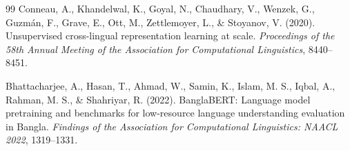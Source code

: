 \documentclass[11pt,twocolumn]{article}
\begin{document}
\begin{thebibliography}{99}
 Conneau, A., Khandelwal, K., Goyal, N., Chaudhary, V., Wenzek, G., Guzmán, F., Grave, E., Ott, M., Zettlemoyer, L., \& Stoyanov, V. (2020). Unsupervised cross-lingual representation learning at scale. \textit{Proceedings of the 58th Annual Meeting of the Association for Computational Linguistics}, 8440--8451.

 Bhattacharjee, A., Hasan, T., Ahmad, W., Samin, K., Islam, M. S., Iqbal, A., Rahman, M. S., \& Shahriyar, R. (2022). BanglaBERT: Language model pretraining and benchmarks for low-resource language understanding evaluation in Bangla. \textit{Findings of the Association for Computational Linguistics: NAACL 2022}, 1319--1331.

\end{thebibliography}
\end{document}
